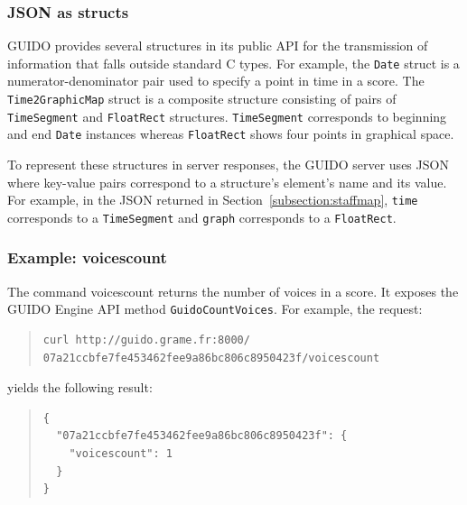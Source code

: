 \documentclass{article}
\newcommand{\guidosize}{6pt}
\begin{document}
\subsubsection{JSON as structs}
GUIDO provides several structures in its public API for the transmission of information that falls outside standard C types.  For example, the \verb=Date= struct is a numerator-denominator pair used to specify a point in time in a score.  The \verb=Time2GraphicMap= struct is a composite structure consisting of pairs of \verb=TimeSegment= and \verb=FloatRect= structures.  \verb=TimeSegment= corresponds to beginning and end \verb=Date= instances whereas \verb=FloatRect= shows four \break points in graphical space.\par
To represent these structures in server responses, the GUIDO server uses JSON where key-value pairs correspond to a structure's element's name and its value.  For example, in the JSON returned in Section~\ref{subsection:staffmap}, \verb=time= corresponds to a \verb=TimeSegment= and \verb=graph= corresponds to a \verb=FloatRect=.
\subsubsection{Example: voicescount}
The command voicescount returns the number of voices in a score.  It exposes the GUIDO Engine API method \verb=GuidoCountVoices=.  For example, the request:
\begin{quote}
\begingroup
\fontsize{\guidosize}{12pt}\selectfont
\begin{verbatim}
curl http://guido.grame.fr:8000/
07a21ccbfe7fe453462fee9a86bc806c8950423f/voicescount
\end{verbatim}
\endgroup
\end{quote}
yields the following result:
\begin{quote}
\begingroup
\fontsize{\guidosize}{12pt}\selectfont
\begin{verbatim}
{
  "07a21ccbfe7fe453462fee9a86bc806c8950423f": {
    "voicescount": 1
  }
}
\end{verbatim}
\endgroup
\end{quote}
~
\end{document}
